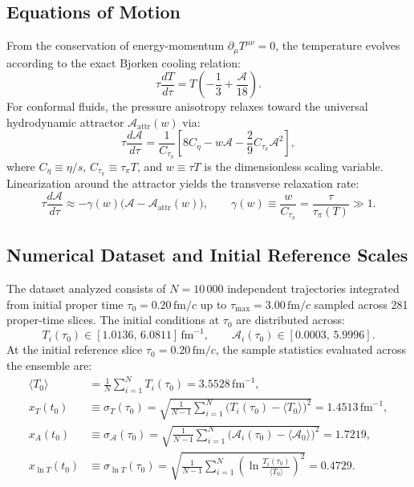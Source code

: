 \documentclass[11pt,a4paper]{article}
\begin{document}
\subsection{Equations of Motion}
From the conservation of energy-momentum $\partial_\mu T^{\mu\nu} = 0$, the temperature evolves according to the exact Bjorken cooling relation:
\begin{equation}
    \tau \frac{dT}{d\tau} = T \left( -\frac{1}{3} + \frac{\mathcal{A}}{18} \right).
    \label{eq:bjorken_cooling}
\end{equation}
For conformal fluids, the pressure anisotropy relaxes toward the universal hydrodynamic attractor $\mathcal{A}_{\mathrm{attr}}(w)$ via:
\begin{equation}
    \tau \frac{d\mathcal{A}}{d\tau} = \frac{1}{C_{\tau_\pi}} \left[ 8 C_\eta - w \mathcal{A} - \frac{2}{9} C_{\tau_\pi} \mathcal{A}^2 \right],
    \label{eq:anisotropy_eq}
\end{equation}
where $C_\eta \equiv \eta/s$, $C_{\tau_\pi} \equiv \tau_\pi T$, and $w \equiv \tau T$ is the dimensionless scaling variable. Linearization around the attractor yields the transverse relaxation rate:
\begin{equation}
    \tau \frac{d\mathcal{A}}{d\tau} \approx -\gamma(w) \big(\mathcal{A} - \mathcal{A}_{\mathrm{attr}}(w)\big), \qquad \gamma(w) \equiv \frac{w}{C_{\tau_\pi}} = \frac{\tau}{\tau_\pi(T)} \gg 1.
    \label{eq:gamma_damping}
\end{equation}

\subsection{Numerical Dataset and Initial Reference Scales}
The dataset analyzed consists of $N = 10\,000$ independent trajectories integrated from initial proper time $\tau_0 = 0.20\,\mathrm{fm}/c$ up to $\tau_{\max} = 3.00\,\mathrm{fm}/c$ sampled across 281 proper-time slices. The initial conditions at $\tau_0$ are distributed across:
\begin{equation}
    T_i(\tau_0) \in [1.0136, \, 6.0811]\,\mathrm{fm}^{-1}, \qquad \mathcal{A}_i(\tau_0) \in [0.0003, \, 5.9996].
\end{equation}
At the initial reference slice $\tau_0 = 0.20\,\mathrm{fm}/c$, the sample statistics evaluated across the ensemble are:
\begin{align}
    \langle T_0 \rangle &= \frac{1}{N} \sum_{i=1}^N T_i(\tau_0) = 3.5528\,\mathrm{fm}^{-1}, \\
    x_T(t_0) &\equiv \sigma_T(\tau_0) = \sqrt{\frac{1}{N-1}\sum_{i=1}^N \big(T_i(\tau_0) - \langle T_0 \rangle\big)^2} = 1.4513\,\mathrm{fm}^{-1}, \\
    x_A(t_0) &\equiv \sigma_{\mathcal{A}}(\tau_0) = \sqrt{\frac{1}{N-1}\sum_{i=1}^N \big(\mathcal{A}_i(\tau_0) - \langle \mathcal{A}_0 \rangle\big)^2} = 1.7219, \\
    x_{\ln T}(t_0) &\equiv \sigma_{\ln T}(\tau_0) = \sqrt{\frac{1}{N-1}\sum_{i=1}^N \left(\ln\frac{T_i(\tau_0)}{\langle T_0 \rangle}\right)^2} = 0.4729.
\end{align}
\end{document}

